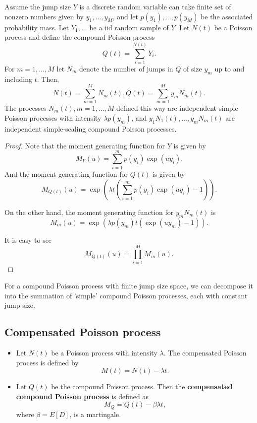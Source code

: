\begin{refsection}
\begin{lemma}\cite[473]{shreve2004stochastic2}
	Assume the jump size $Y$ is a discrete random variable can take finite set of nonzero numbers given by $y_1,\dots,y_M$, and let $p(y_1),...,p(y_M)$ be the associated probability mass. Let $Y_1,\dots$ be a iid random sample of $Y$. Let $N(t)$ be a Poisson process and define the compound Poisson process
	$$Q(t) = \sum_{i=1}^{N(t)} Y_i.$$
	For $m = 1,\dots,M$ let $N_m$ denote the number of jumps in $Q$ of size $y_m$ up to and including $t$. Then,
	$$N(t) = \sum_{m=1}^M N_m(t), Q(t) = \sum_{m=1}^M y_m N_m(t).$$
	The processes $N_m(t), m=1,\dots,M$ defined this way are independent simple Poisson processes with intensity $\lambda p(y_m)$, and $y_1N_1(t),\dots,y_mN_m(t)$ are independent simple-scaling compound Poisson processes. 
\end{lemma}
\begin{proof}
	Note that the moment generating function for $Y$ is given by
	$$M_Y(u) = \sum_{i=1}^m p(y_i)\exp(uy_i).$$
	And the moment generating function for $Q(t)$ is given by
	$$M_{Q(t)}(u) = \exp(\lambda t (\sum_{i=1}^m p(y_i)\exp(uy_i) -1)).$$
	
	On the other hand, the moment generating function for $y_m N_m(t)$ is
	$$M_m(u) = \exp(\lambda p(y_m) t (\exp(u y_m) - 1)).$$
	
	It is easy to see
	$$M_{Q(t)}(u) = \prod_{i=1}^M M_m(u).$$
\end{proof}


\begin{remark}[interpretation]
	For a compound Poisson process with finite jump size space, we can decompose it into the summation of 'simple' compound Poisson processes, each with constant jump size. 
\end{remark}

\subsection{Compensated Poisson process}

\begin{definition}\hfill
	\begin{itemize}
		\item Let $N(t)$ be a Poisson process with intensity $\lambda$. The compensated Poisson process is defined by
		$$M(t) = N(t) - \lambda t.$$
		\item 	Let $Q(t)$ be the compound Poisson process. Then the \textbf{compensated compound Poisson process} is defined as $$M_Q = Q(t) - \beta \lambda t,$$
		where $\beta = E[D]$, is a martingale. 
	\end{itemize}	
	

\end{definition}
\end{refsection}
